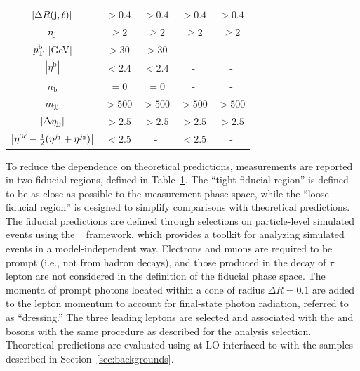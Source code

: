 \begin{table}[!ht]
\begin{center}
\begin{tabular}{c|c|c|c|c}
  $\left|\Delta R(\mathrm{j}, \ell)\right|$            & $ > 0.4$  & $> 0.4$       & $> 0.4$        & $> 0.4$ \\
  $n_{\mathrm{\mathrm{j}}}           $    & $\ge 2$   & $\ge 2$       & $\ge 2$        & $\ge 2$    \\
  $p_{\mathrm{T}}^{\mathrm{b}}         $ [GeV] & $ > 30$   & $ > 30$       &   -            &   -     \\
    $\left|\eta^{\mathrm{b}}\right|  $      & $< 2.4$   & $< 2.4$ &   -            &   -     \\
  $n_{\text{b}}       $         & $= 0$     & $= 0$         &   -            &   -     \\
  $m_{\mathrm{jj}}             $               & $> 500$   & $> 500$       & $> 500$        & $> 500$ \\
  $\left|\Delta\eta_{\mathrm{jj}} \right|$            &$> 2.5$         & $> 2.5$ & $> 2.5$ & $> 2.5$ \\
  $\left| \eta^{3\ell} - \frac{1}{2}(\eta^{j_{1}} + \eta^{j_{2}}) \right|$            & $< 2.5$ & - & $< 2.5$ & - \\
  \end{tabular}
  \label{tab:selections}
  \end{center}
\end{table}

To reduce the dependence on theoretical predictions, 
measurements are reported in two fiducial regions, defined in Table~\ref{tab:selections}.
The ``tight fiducial region'' is defined to be as close as possible to the measurement phase space,
while the ``loose fiducial region'' is designed to simplify comparisons with theoretical predictions.
The fiducial predictions are defined through selections on particle-level
simulated events using the \Rivet~\cite{Buckley:2010ar} framework, which 
provides a toolkit for analyzing simulated events in a model-independent way.
Electrons and muons are required to be prompt (i.e., not from hadron decays), 
and those produced in the decay of $\tau$ lepton
are not considered in the definition
of the fiducial phase space.
The momenta of prompt photons located within a cone of radius $\Delta R = 0.1$ are added to the lepton
momentum to account for final-state photon radiation, referred to as ``dressing.''
The three leading \pt leptons are selected and associated with the \W and \Z
bosons with the same procedure as described for the analysis selection.
Theoretical predictions are evaluated using \MG at LO interfaced to \PYTHIA with the samples
described in Section~\ref{sec:backgrounds}.

